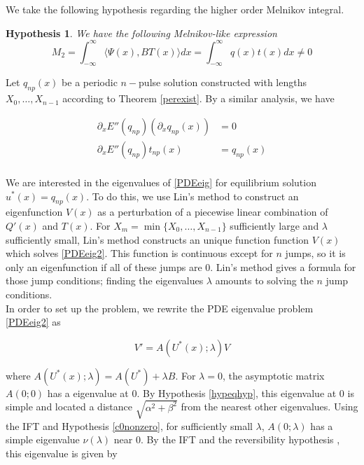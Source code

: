 \documentclass[12pt]{article}
\newtheorem{hypothesis}{Hypothesis}
\begin{document}
We take the following hypothesis regarding the higher order Melnikov integral.

\begin{hypothesis}\label{Melnikov2hyp}
We have the following Melnikov-like expression
\begin{equation}\label{M2}
M_2 = \int_{-\infty}^\infty \langle \Psi(x), B T(x) \rangle dx =
\int_{-\infty}^\infty q(x) t(x) dx \neq 0
\end{equation}
\end{hypothesis}

Let $q_{np}(x)$ be a periodic $n-$pulse solution constructed with lengths $X_0, \dots, X_{n-1}$ according to Theorem \ref{perexist}. By a similar analysis, we have

\begin{align*}
\partial_x E''(q_{np}) (\partial_x q_{np}(x)) &= 0 \\
\partial_x E''(q_{np}) t_{np}(x) &= q_{np}(x) \\
\end{align*}

We are interested in the eigenvalues of \eqref{PDEeig} for equilibrium solution $u^*(x) = q_{np}(x)$. To do this, we use Lin's method to construct an eigenfunction $V(x)$ as a perturbation of a piecewise linear combination of $Q'(x)$ and $T(x)$. For $X_m = \min\{X_0, \dots, X_{n-1} \}$ sufficiently large and $\lambda$ sufficiently small, Lin's method constructs an unique function function $V(x)$ which solves \eqref{PDEeig2}. This function is continuous except for $n$ jumps, so it is only an eigenfunction if all of these jumps are 0. Lin's method gives a formula for those jump conditions; finding the eigenvalues $\lambda$ amounts to solving the $n$ jump conditions.\\

In order to set up the problem, we rewrite the PDE eigenvalue problem \eqref{PDEeig2} as

\begin{equation}\label{PDEeig3}
V' = A(U^*(x); \lambda)V 
\end{equation} 

where $A(U^*(x); \lambda) = A(U^*) + \lambda B$. For $\lambda = 0$, the asymptotic matrix $A(0; 0)$ has a eigenvalue at 0. By Hypothesis \ref{hypeqhyp}, this eigenvalue at 0 is simple and located a distance $\sqrt{\alpha^2 + \beta^2}$ from the nearest other eigenvalues. Using the IFT and Hypothesis \ref{c0nonzero}, for sufficiently small $\lambda$, $A(0; \lambda)$ has a simple eigenvalue $\nu(\lambda)$ near 0. By the IFT and the reversibility hypothesis , this eigenvalue is given by
\end{document}
